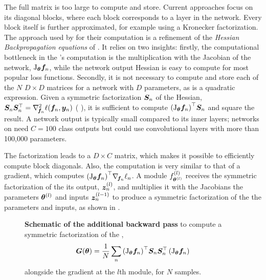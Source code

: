The full matrix is too large to compute and store. Current approaches focus on
its diagonal blocks, where each block corresponds to a layer in the network.
Every block itself is further approximated, for example using a Kronecker
factorization. The approach used by \BackPACK%
for their computation is a refinement of the \emph{Hessian Backpropagation
  equations} of \citet{dangel2020modular}. It relies on two insights: firstly,
the computational bottleneck in the \ggn's computation is the multiplication
with the Jacobian of the network, $\mathrm{J}_{\bm{\theta}} {\bm{f}}_n$, while the network output
Hessian is easy to compute for most popular loss functions. Secondly, it is not
necessary to compute and store each of the $N$ $D \times D$ matrices for a
network with $D$ parameters, as  is a quadratic
expression. Given a symmetric factorization ${\bm{S}}_n$ of the Hessian,
${\bm{S}}_n{\bm{S}}_n^\top = \nabla_{\!{{\bm{f}}_n}}^{2} \ell({\bm{f}}_n, {\bm{y}}_n)$ (\eg
{}), it is sufficient to compute
${(\mathrm{J}_{\bm{\theta}} {\bm{f}}_n)}^\top {\bm{S}}_n$ and square the result. A network output is
typically small compared to its inner layers; networks on \CIFARHUN%
need $C=100$ class outputs but could use convolutional layers with more than
100,000 parameters.

The factorization leads to a $D \times C$ matrix, which makes it possible to
efficiently compute \GGN%
block diagonals. Also, the computation is very similar to that of a gradient,
which computes ${(\mathrm{J}_{\bm{\theta}} {\bm{f}}_n)}^\top \nabla_{\!{{\bm{f}}_n}} \ell_n$. A module
$f^{(l)}_{{\bm{\theta}}^{(l)}}$ receives the symmetric factorization of the \GGN%
\wrt its output, ${\bm{z}}^{(l)}_n$, and multiplies it with the Jacobians
\wrt the parameters ${\bm{\theta}}^{(l)}$ and inputs ${\bm{z}}^{(l-1)}_n$ to
produce a symmetric factorization of the \GGN%
\wrt the parameters and inputs, as shown in
.

\begin{figure}[!t]
  \centering
  \tikzexternalenable%
  
  \tikzexternaldisable%
  \caption{\textbf{Schematic of the additional backward pass} to compute a
    symmetric factorization of the \GGN,
    \begin{align*}
      {\bm{G}}({\bm{\theta}}) = \frac{1}{N} \sum_n {\left(\mathrm{J}_{{\bm{\theta}}} {\bm{f}}_n\right)}^\top {\bm{S}}_n {\bm{S}}_n^\top
      \left(\mathrm{J}_{{\bm{\theta}}} {\bm{f}}_n\right)
    \end{align*}
    alongside the gradient at the $l$th module, for $N$ samples.
  }\label{backpack::fig:second-order-pass}
\end{figure}

